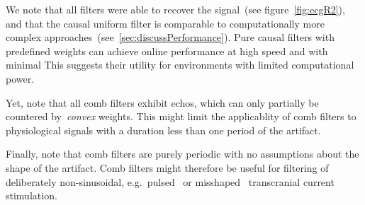 \documentclass[a4paper]{article}
\newcommand{\figref}[1]{(see figure~\ref{#1})}
\newcommand{\secref}[1]{(see~\ref{#1})}
\begin{document}
We note that all filters were able to recover the signal~\figref{fig:ecgR2}, and that the causal uniform filter is comparable to computationally more complex approaches~\secref{sec:discussPerformance}. Pure causal filters with predefined weights can achieve online performance at high speed and with minimal This suggests their utility for environments with limited computational power.

Yet, note that all comb filters exhibit echos, which  can only partially be countered by~\emph{convex} weights. This might limit the applicablity of comb filters to physiological signals with a duration less than one period of the artifact.

Finally, note that comb filters are purely periodic with no assumptions about the shape of the artifact. Comb filters might therefore be useful for filtering of deliberately non-sinusoidal, e.g.\ pulsed~\citep{Jaberzadeh_2015} or misshaped~\citep{Cole_2017} transcranial current stimulation.



\end{document}
